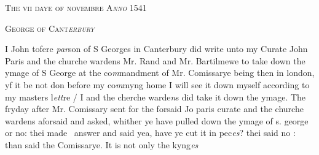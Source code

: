 \documentclass[12pt, a4paper]{book}
\begin{document}
 
 
 
 

            
            
               
				\begin{center} \begin{large} {\scshape The vii daye of novembre A\textit{nno} 1541
               } \end{large} \end{center}
			
               
               	
				\begin{center}  {\scshape George of Cant\textit{erbury}
                  }  \end{center}
			
               	
               		
			
               	
               		
				\marginpar[\vspace{0.5cm}{\textcolor{Gray}{Images}}]{}
			
               		
		\ifthenelse{\isodd{\thepage}}
		{\reversemarginpar}
		{\normalmarginpar}
		I John tofere \textit{par}son of S Georges in Canterbury did
               			write unto my Curate John Paris and the churche
               				wardens Mr. Rand and Mr. Bartilmewe to take down
  the ymage of S George at the co\textit{m}mandment of Mr.
  	Comissarye being then in london, yf it be not don
 before my co\textit{m}myng home I will see it down myself
 according to my masters l\textit{ett}re / I and the cherche warde\textit{n}s
               			did take it down the ymage. The fryday after Mr.
               				Comissary sent for the forsaid Jo paris curate and
 the churche wardens aforsaid and asked, whither ye
 have pulled down the ymage of s. george or no: thei made 
 answer and said yea, have ye cut it in pec\textit{es}? thei said
               			no : than said the Comissarye. It is not only the kyng\textit{es}
                  


\dotfill
						\newpage {} \subsection*{}  \subsection*{}
\end{document}
